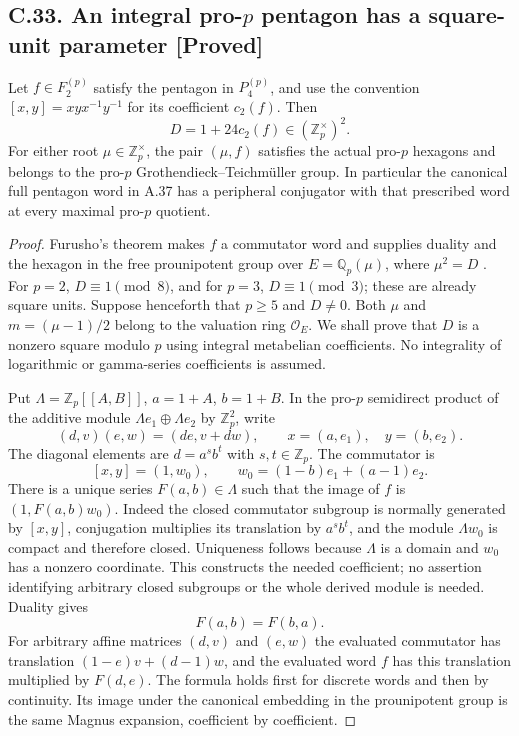 \documentclass[11pt]{article}
\newcommand{\statement}[3]{\subsection*{#1. #3 [#2]}}
\begin{document}
\statement{C.33}{Proved}{An integral pro-$p$ pentagon has a square-unit parameter}
Let $f\in F_2^{(p)}$ satisfy the pentagon in $P_4^{(p)}$, and use
the convention $[x,y]=xyx^{-1}y^{-1}$ for its coefficient $c_2(f)$.
Then
\[
               D=1+24c_2(f)\in(\mathbb Z_p^\times)^2.            \tag{C.33.1}
\]
For either root $\mu\in\mathbb Z_p^\times$, the pair $(\mu,f)$
satisfies the actual pro-$p$ hexagons and belongs to the pro-$p$
Grothendieck--Teichm\"uller group. In particular the canonical
full pentagon word in A.37 has a peripheral conjugator with that
prescribed word at every maximal pro-$p$ quotient.

\begin{proof}
Furusho's theorem makes $f$ a commutator word and supplies duality
and the hexagon in the free prounipotent group over
$E=\mathbb Q_p(\mu)$, where $\mu^2=D$
\cite[Theorem 2 and Corollary 12]{Furusho2010}. For $p=2$,
$D\equiv1\pmod8$, and for $p=3$, $D\equiv1\pmod3$; these are
already square units. Suppose henceforth that $p\geq5$ and
$D\ne0$. Both $\mu$ and $m=(\mu-1)/2$ belong to the valuation
ring $\mathcal O_E$. We shall prove that $D$ is a nonzero square
modulo $p$ using integral metabelian coefficients. No integrality
of logarithmic or gamma-series coefficients is assumed.

Put $\Lambda=\mathbb Z_p[[A,B]]$, $a=1+A$, $b=1+B$. In the
pro-$p$ semidirect product of the additive module
$\Lambda e_1\oplus\Lambda e_2$ by $\mathbb Z_p^2$, write
\[
 (d,v)(e,w)=(de,v+dw),\qquad
 x=(a,e_1),\quad y=(b,e_2).
\]
The diagonal elements are $d=a^s b^t$ with $s,t\in\mathbb Z_p$.
The commutator is
\[
 [x,y]=(1,w_0),\qquad
 w_0=(1-b)e_1+(a-1)e_2.
\]
There is a unique series $F(a,b)\in\Lambda$ such that the image
of $f$ is $(1,F(a,b)w_0)$. Indeed the closed commutator subgroup
is normally generated by $[x,y]$, conjugation multiplies its
translation by $a^s b^t$, and the module $\Lambda w_0$ is compact
and therefore closed. Uniqueness follows because $\Lambda$ is a
domain and $w_0$ has a nonzero coordinate. This constructs the
needed coefficient; no assertion identifying arbitrary closed
subgroups or the whole derived module is needed. Duality gives
\[
                              F(a,b)=F(b,a).                    \tag{C.33.2}
\]
For arbitrary affine matrices $(d,v)$ and $(e,w)$ the evaluated
commutator has translation $(1-e)v+(d-1)w$, and the evaluated
word $f$ has this translation multiplied by $F(d,e)$. The formula
holds first for discrete words and then by continuity. Its image
under the canonical embedding in the prounipotent group is the
same Magnus expansion, coefficient by coefficient.


\end{proof}
\end{document}
